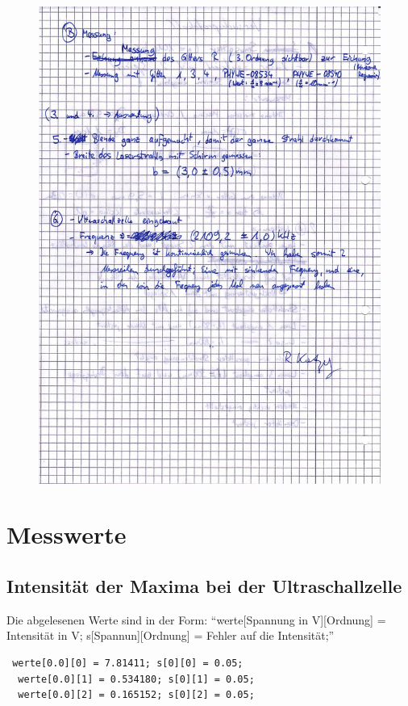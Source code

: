\begin{appendix}
\begin{figure}[H]
\centering \includegraphics[width=\textwidth]{Bilder/Protokoll2.jpg}
\end{figure}

\section{Messwerte}

\subsection[Intensität der Maxima]{Intensität der Maxima bei der Ultraschallzelle}

Die abgelesenen Werte sind in der Form:
"`werte[Spannung in V][Ordnung] = Intensität in V; s[Spannun][Ordnung] = Fehler auf die Intensität;"'

\begin{verbatim}
 werte[0.0][0] = 7.81411; s[0][0] = 0.05;
  werte[0.0][1] = 0.534180; s[0][1] = 0.05;
  werte[0.0][2] = 0.165152; s[0][2] = 0.05;
  

\end{verbatim}
\end{appendix}

